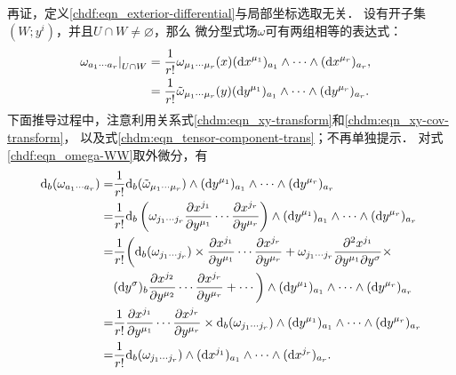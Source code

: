 再证，定义\eqref{chdf:eqn_exterior-differential}与局部坐标选取无关．
设有开子集$(W;y^i)$，并且$U\cap W \neq \varnothing$，那么
微分型式场$\omega$可有两组相等的表达式：
\begin{align}
    \left. \omega_{a_{1}\cdots a_{r}} \right|_{U\cap W}
    &= \frac{1}{r!} \omega_{\mu_{1}\cdots \mu_{r}}(x)
    ({\rm d}x^{\mu_1})_{a_{1}} \wedge\cdots\wedge ({\rm d}x^{\mu_r})_{a_{r}} ,
      \quad  \label{chdf:eqn_omega-UU} \\
    &= \frac{1}{r!} \tilde{\omega}_{\mu_{1}\cdots \mu_{r}}(y)
    ({\rm d}y^{\mu_1})_{a_{1}} \wedge\cdots\wedge ({\rm d}y^{\mu_r})_{a_{r}} .
      \quad  \label{chdf:eqn_omega-WW}
\end{align}
下面推导过程中，注意利用关系式\eqref{chdm:eqn_xy-transform}和\eqref{chdm:eqn_xy-cov-transform}，
以及式\eqref{chdm:eqn_tensor-component-trans}；不再单独提示．
对式\eqref{chdf:eqn_omega-WW}取外微分，有
\begin{align*}
    {\rm d}_b ( \omega_{a_{1}\cdots a_{r}}) =&
       \frac{1}{r!} {\rm d}_b (\tilde{\omega}_{\mu_{1}\cdots \mu_{r}}) \wedge
      ({\rm d}y^{\mu_1})_{a_{1}} \wedge\cdots\wedge ({\rm d}y^{\mu_r})_{a_{r}}  \\
    =& \frac{1}{r!} {\rm d}_b \left( {\omega}_{j_1\cdots j_r}
    \frac{\partial x^{j_1}}{\partial y^{\mu_1}} \cdots
    \frac{\partial x^{j_r}}{\partial y^{\mu_r}} \right) \wedge
    ({\rm d}y^{\mu_1})_{a_{1}} \wedge\cdots\wedge ({\rm d}y^{\mu_r})_{a_{r}}  \\
    =& \frac{1}{r!} \biggl( {\rm d}_b ({\omega}_{j_1\cdots j_r} )
     \times \frac{\partial x^{j_1}}{\partial y^{\mu_1}} \cdots
    \frac{\partial x^{j_r}}{\partial y^{\mu_r}}
    +  {\omega}_{j_1\cdots j_r}
    \frac{\partial^2 x^{j_1}}{\partial y^{\mu_1} \partial y^{\sigma} } \times\\
    &({\rm d}y^{\sigma})_{b}
    \frac{\partial x^{j_2}}{\partial y^{\mu_2}} \cdots
    \frac{\partial x^{j_r}}{\partial y^{\mu_r}} + \cdots  \biggr) \wedge
    ({\rm d}y^{\mu_1})_{a_{1}} \wedge\cdots\wedge ({\rm d}y^{\mu_r})_{a_{r}}  \\
    =& \frac{1}{r!} \frac{\partial x^{j_1}}{\partial y^{\mu_1}} \cdots
    \frac{\partial x^{j_r}}{\partial y^{\mu_r}}  \times
     {\rm d}_b ({\omega}_{j_1\cdots j_r} ) \wedge
    ({\rm d}y^{\mu_1})_{a_{1}} \wedge\cdots\wedge ({\rm d}y^{\mu_r})_{a_{r}}  \\
    =& \frac{1}{r!}  {\rm d}_b (\omega_{j_{1}\cdots j_{r}})\wedge
    ({\rm d}x^{j_1})_{a_{1}} \wedge\cdots\wedge ({\rm d}x^{j_r})_{a_{r}} .
\end{align*}
